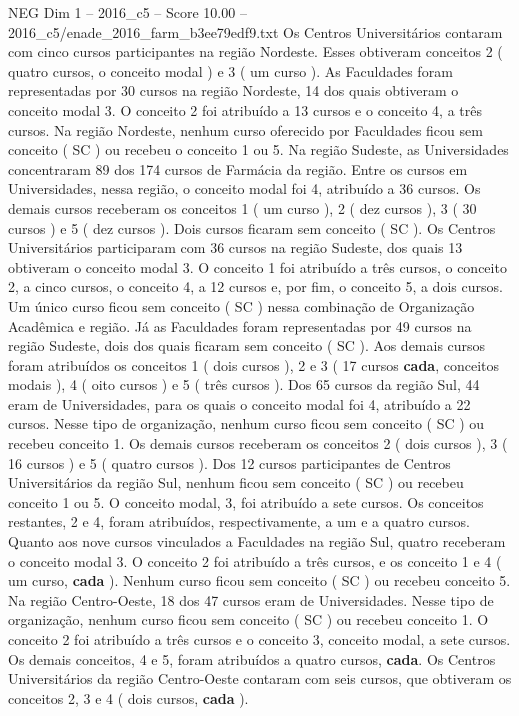 \begin{textsample}{NEG Dim 1 – 2016\_c5 – Score 10.00 – 2016\_c5/enade\_2016\_farm\_b3ee79edf9.txt}
Os Centros Universitários contaram com cinco cursos participantes na região Nordeste.
Esses obtiveram conceitos 2 ( quatro cursos, o conceito modal ) e 3 ( um curso ).
As Faculdades foram representadas por 30 cursos na região Nordeste, 14 dos quais obtiveram o conceito modal 3.
O conceito 2 foi atribuído a 13 cursos e o conceito 4, a três cursos.
Na região Nordeste, nenhum curso oferecido por Faculdades ficou sem conceito ( SC ) ou recebeu o conceito 1 ou 5.
Na região Sudeste, as Universidades concentraram 89 dos 174 cursos de Farmácia da região.
Entre os cursos em Universidades, nessa região, o conceito modal foi 4, atribuído a 36 cursos.
Os demais cursos receberam os conceitos 1 ( um curso ), 2 ( dez cursos ), 3 ( 30 cursos ) e 5 ( dez cursos ).
Dois cursos ficaram sem conceito ( SC ).
Os Centros Universitários participaram com 36 cursos na região Sudeste, dos quais 13 obtiveram o conceito modal 3.
O conceito 1 foi atribuído a três cursos, o conceito 2, a cinco cursos, o conceito 4, a 12 cursos e, por fim, o conceito 5, a dois cursos.
Um único curso ficou sem conceito ( SC ) nessa combinação de Organização Acadêmica e região.
Já as Faculdades foram representadas por 49 cursos na região Sudeste, dois dos quais ficaram sem conceito ( SC ).
Aos demais cursos foram atribuídos os conceitos 1 ( dois cursos ), 2 e 3 ( 17 cursos \textbf{cada}, conceitos modais ), 4 ( oito cursos ) e 5 ( três cursos ).
Dos 65 cursos da região Sul, 44 eram de Universidades, para os quais o conceito modal foi 4, atribuído a 22 cursos.
Nesse tipo de organização, nenhum curso ficou sem conceito ( SC ) ou recebeu conceito 1.
Os demais cursos receberam os conceitos 2 ( dois cursos ), 3 ( 16 cursos ) e 5 ( quatro cursos ).
Dos 12 cursos participantes de Centros Universitários da região Sul, nenhum ficou sem conceito ( SC ) ou recebeu conceito 1 ou 5.
O conceito modal, 3, foi atribuído a sete cursos.
Os conceitos restantes, 2 e 4, foram atribuídos, respectivamente, a um e a quatro cursos.
Quanto aos nove cursos vinculados a Faculdades na região Sul, quatro receberam o conceito modal 3.
O conceito 2 foi atribuído a três cursos, e os conceito 1 e 4 ( um curso, \textbf{cada} ).
Nenhum curso ficou sem conceito ( SC ) ou recebeu conceito 5.
Na região Centro-Oeste, 18 dos 47 cursos eram de Universidades.
Nesse tipo de organização, nenhum curso ficou sem conceito ( SC ) ou recebeu conceito 1.
O conceito 2 foi atribuído a três cursos e o conceito 3, conceito modal, a sete cursos.
Os demais conceitos, 4 e 5, foram atribuídos a quatro cursos, \textbf{cada}.
Os Centros Universitários da região Centro-Oeste contaram com seis cursos, que obtiveram os conceitos 2, 3 e 4 ( dois cursos, \textbf{cada} ).

\end{textsample}
